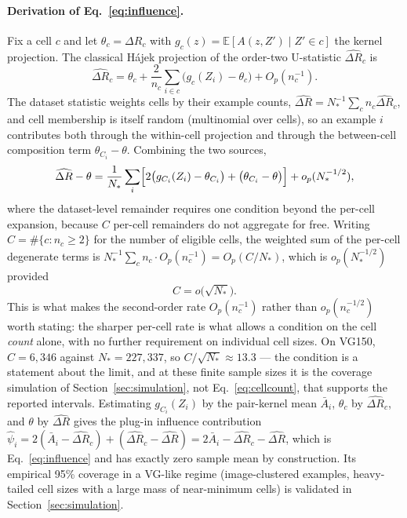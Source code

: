 \paragraph{Derivation of Eq.~\eqref{eq:influence}.} Fix a cell $c$ and let
$\theta_c=\Delta R_c$ with $g_c(z)=\mathbb E[A(z,Z')\mid Z'\in c]$ the kernel
projection. The classical H\'ajek projection of the order-two U-statistic
$\widehat{\Delta R}_c$ is
\[
\widehat{\Delta R}_c=\theta_c+\frac{2}{n_c}\sum_{i\in c}\bigl(g_c(Z_i)-\theta_c\bigr)
+O_p(n_c^{-1}).
\]
The dataset statistic weights cells by their example counts,
$\widehat{\Delta R}=N_*^{-1}\sum_c n_c\widehat{\Delta R}_c$, and cell membership is
itself random (multinomial over cells), so an example $i$ contributes both through the
within-cell projection and through the between-cell composition term
$\theta_{C_i}-\theta$. Combining the two sources,
\[
\widehat{\Delta R}-\theta
=\frac{1}{N_*}\sum_{i}\Bigl[2\bigl(g_{C_i}(Z_i)-\theta_{C_i}\bigr)
+\bigl(\theta_{C_i}-\theta\bigr)\Bigr]+o_p(N_*^{-1/2}),
\]
where the dataset-level remainder requires one condition beyond the per-cell expansion,
because $C$ per-cell remainders do not aggregate for free. Writing
$C=\#\{c:n_c\ge2\}$ for the number of eligible cells, the weighted sum of the per-cell
degenerate terms is $N_*^{-1}\sum_cn_c\cdot O_p(n_c^{-1})=O_p(C/N_*)$, which is
$o_p(N_*^{-1/2})$ provided
\begin{equation}
C=o\bigl(\sqrt{N_*}\bigr).
\label{eq:cellcount}
\end{equation}
This is what makes the second-order rate $O_p(n_c^{-1})$ rather than $o_p(n_c^{-1/2})$
worth stating: the sharper per-cell rate is what allows a condition on the cell
\emph{count} alone, with no further requirement on individual cell sizes. On VG150,
$C=6{,}346$ against $N_*=227{,}337$, so $C/\sqrt{N_*}\approx13.3$ --- the condition is a
statement about the limit, and at these finite sample sizes it is the coverage simulation
of Section~\ref{sec:simulation}, not Eq.~\eqref{eq:cellcount}, that supports the reported
intervals.
Estimating $g_{C_i}(Z_i)$ by the pair-kernel mean $\bar A_i$, $\theta_c$ by
$\widehat{\Delta R}_c$, and $\theta$ by $\widehat{\Delta R}$ gives the plug-in
influence contribution
$\widehat\psi_i=2(\bar A_i-\widehat{\Delta R}_{c})+(\widehat{\Delta R}_{c}
-\widehat{\Delta R})=2\bar A_i-\widehat{\Delta R}_{c}-\widehat{\Delta R}$, which is
Eq.~\eqref{eq:influence} and has exactly zero sample mean by construction. Its empirical
95\% coverage in a VG-like regime (image-clustered examples, heavy-tailed cell sizes with
a large mass of near-minimum cells) is validated in Section~\ref{sec:simulation}.

